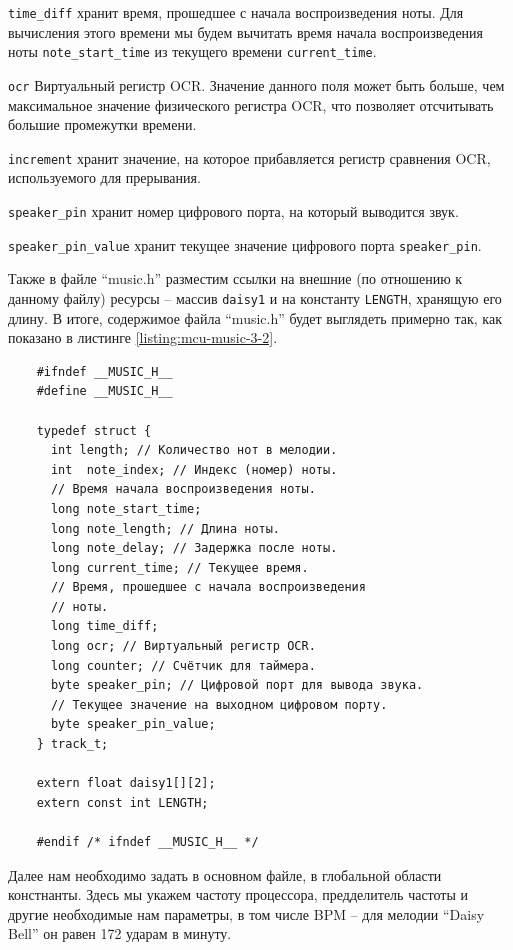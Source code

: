 \documentclass[../sparc.tex]{subfiles}
\begin{document}
\texttt{time_diff} хранит время, прошедшее с начала воспроизведения
ноты.  Для вычисления этого времени мы будем вычитать время начала
воспроизведения ноты \texttt{note_start_time} из текущего времени
\texttt{current_time}.

\texttt{ocr} Виртуальный регистр OCR.  Значение данного поля может быть
больше, чем максимальное значение физического регистра OCR, что позволяет
отсчитывать большие промежутки времени.

\texttt{increment} хранит значение, на которое прибавляется регистр
сравнения OCR, используемого для прерывания.

\texttt{speaker_pin} хранит номер цифрового порта, на который выводится
звук.

\texttt{speaker_pin_value} хранит текущее значение цифрового порта
\texttt{speaker_pin}.

Также в файле ``music.h'' разместим ссылки на внешние (по отношению к данному
файлу) ресурсы -- массив \texttt{daisy1} и на константу
\texttt{LENGTH}, хранящую его длину.  В итоге, содержимое файла
``music.h'' будет выглядеть примерно так, как показано в листинге
\ref{listing:mcu-music-3-2}.

\begin{listing}[ht]
  \begin{verbatim}
    #ifndef __MUSIC_H__
    #define __MUSIC_H__

    typedef struct {
      int length; // Количество нот в мелодии.
      int  note_index; // Индекс (номер) ноты.
      // Время начала воспроизведения ноты.
      long note_start_time;
      long note_length; // Длина ноты.
      long note_delay; // Задержка после ноты.
      long current_time; // Текущее время.
      // Время, прошедшее с начала воспроизведения
      // ноты.
      long time_diff;
      long ocr; // Виртуальный регистр OCR.
      long counter; // Счётчик для таймера.
      byte speaker_pin; // Цифровой порт для вывода звука.
      // Текущее значение на выходном цифровом порту.
      byte speaker_pin_value;
    } track_t;

    extern float daisy1[][2];
    extern const int LENGTH;

    #endif /* ifndef __MUSIC_H__ */
  \end{verbatim}
  \caption{Содержимое файла ``music.h''.}
  \label{listing:mcu-music-3-2}
\end{listing}

Далее нам необходимо задать в основном файле, в глобальной области констнанты.
Здесь мы укажем частоту процессора, предделитель частоты и другие необходимые
нам параметры, в том числе \gls{BPM} -- для мелодии ``Daisy Bell'' он равен 172
ударам в минуту.
\end{document}

